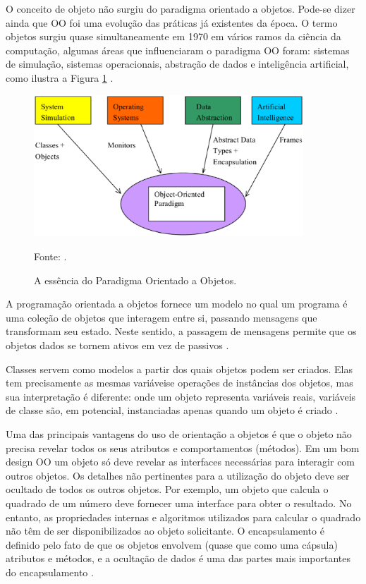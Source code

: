 O conceito de objeto não surgiu do paradigma orientado a objetos. Pode-se dizer ainda que OO foi uma evolução das práticas já existentes da época. O termo objetos surgiu quase simultaneamente em 1970 em vários ramos da ciência da computação, algumas áreas que influenciaram o paradigma OO foram: sistemas de simulação, sistemas operacionais, abstração de dados e inteligência artificial, como ilustra a Figura \ref{essenciaOO} \cite[pág.~1]{capretz2003}.

\begin{figure}[H]
\centering
\includegraphics[width=0.9\textwidth]{figuras/essenciaOO}
\caption{A essência do Paradigma Orientado a Objetos.}{Fonte: .} 
\label{essenciaOO}
\end{figure}

A programação orientada a objetos fornece um modelo no qual um programa é uma coleção de objetos que interagem entre si, passando mensagens que transformam seu estado. Neste sentido, a passagem de mensagens permite que os objetos dados se tornem ativos em vez de passivos \cite[pág.~310]{tucker2009}.

Classes servem como modelos a partir dos quais objetos podem ser criados. Elas tem precisamente as mesmas variáveise operações de instâncias dos objetos, mas sua interpretação é diferente: onde um objeto representa variáveis reais, variáveis de classe são, em potencial, instanciadas apenas quando um objeto é criado  \cite[pág.~10]{wegner1990}.

Uma das principais vantagens do uso de orientação a objetos é que o objeto não precisa revelar todos os seus atributos e comportamentos (métodos). Em um bom design OO um objeto só deve revelar as interfaces necessárias para interagir com outros objetos. Os detalhes não pertinentes para a utilização do objeto deve ser ocultado de todos os outros objetos. Por exemplo, um objeto que calcula o quadrado de um número deve fornecer uma interface para obter o resultado. No entanto, as propriedades internas e algoritmos utilizados para calcular o quadrado não têm de ser disponibilizados ao objeto solicitante. O encapsulamento  é definido pelo fato de que os objetos envolvem (quase que como uma cápsula) atributos e métodos, e a ocultação de dados é uma das partes mais importantes do encapsulamento \cite[pág.~19]{weisfeld2009}.

